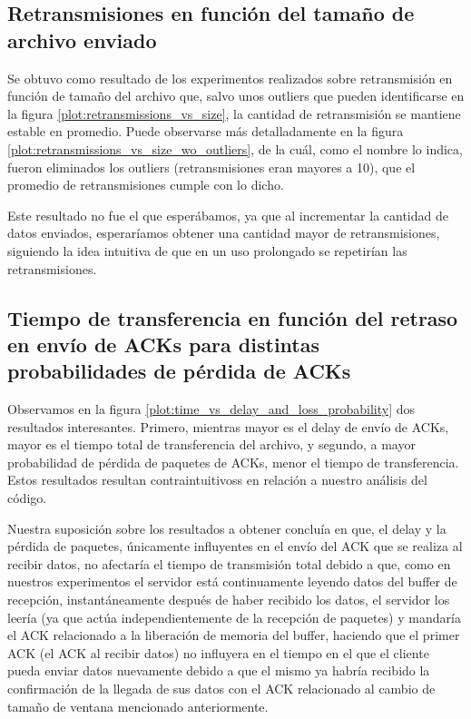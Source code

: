\documentclass[a4paper, 10pt, twoside]{article}
\begin{document}
\subsection{Retransmisiones en función del tamaño de archivo enviado}

Se obtuvo como resultado de los experimentos realizados sobre retransmisión en función de tamaño del archivo que, salvo unos outliers que pueden identificarse en la figura \ref{plot:retransmissions_vs_size}, la cantidad de retransmisión se mantiene estable en promedio. Puede observarse más detalladamente en la figura \ref{plot:retransmissions_vs_size_wo_outliers}, de la cuál, como el nombre lo indica, fueron eliminados los outliers (retransmisiones eran mayores a 10), que el promedio de retransmisiones cumple con lo dicho.

Este resultado no fue el que esperábamos, ya que al incrementar la cantidad de datos enviados, esperaríamos obtener una cantidad mayor de retransmisiones, siguiendo la idea intuitiva de que en un uso prolongado se repetirían las retransmisiones.

\subsection{Tiempo de transferencia en función del retraso en envío de ACKs para distintas probabilidades de pérdida de ACKs}

Observamos en la figura \ref{plot:time_vs_delay_and_loss_probability} dos resultados interesantes. Primero, mientras mayor es el delay de envío de ACKs, mayor es el tiempo total de transferencia del archivo, y segundo, a mayor probabilidad de pérdida de paquetes de ACKs, menor el tiempo de transferencia. Estos resultados resultan contraintuitivoss en relación a nuestro análisis del código. 

Nuestra suposición sobre los resultados a obtener concluía en que, el delay y la pérdida de paquetes, únicamente influyentes en el envío del ACK que se realiza al recibir datos, no afectaría el tiempo de transmisión total debido a que, como en nuestros experimentos el servidor está continuamente leyendo datos del buffer de recepción, instantáneamente después de haber recibido los datos, el servidor los leería (ya que actúa independientemente de la recepción de paquetes) y mandaría el ACK relacionado a la liberación de memoria del buffer, haciendo que el primer ACK (el ACK al recibir datos) no influyera en el tiempo en el que el cliente pueda enviar datos nuevamente debido a que el mismo ya habría recibido la confirmación de la llegada de sus datos con el ACK relacionado al cambio de tamaño de ventana mencionado anteriormente.
\end{document}
